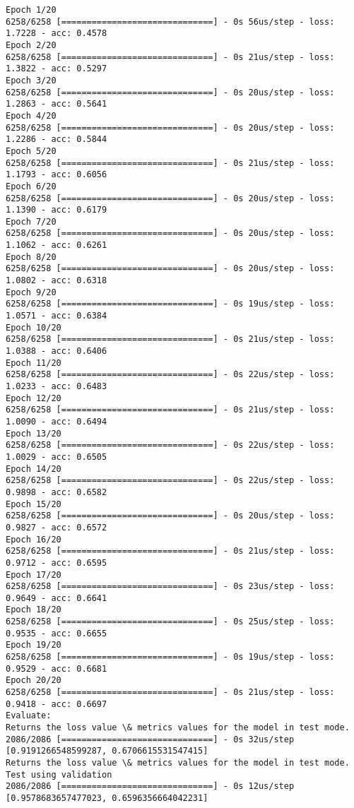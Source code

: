 \documentclass[11pt]{article}
\begin{document}
    \begin{Verbatim}[commandchars=\\\{\}]
Epoch 1/20
6258/6258 [==============================] - 0s 56us/step - loss: 1.7228 - acc: 0.4578
Epoch 2/20
6258/6258 [==============================] - 0s 21us/step - loss: 1.3822 - acc: 0.5297
Epoch 3/20
6258/6258 [==============================] - 0s 20us/step - loss: 1.2863 - acc: 0.5641
Epoch 4/20
6258/6258 [==============================] - 0s 20us/step - loss: 1.2286 - acc: 0.5844
Epoch 5/20
6258/6258 [==============================] - 0s 21us/step - loss: 1.1793 - acc: 0.6056
Epoch 6/20
6258/6258 [==============================] - 0s 20us/step - loss: 1.1390 - acc: 0.6179
Epoch 7/20
6258/6258 [==============================] - 0s 20us/step - loss: 1.1062 - acc: 0.6261
Epoch 8/20
6258/6258 [==============================] - 0s 20us/step - loss: 1.0802 - acc: 0.6318
Epoch 9/20
6258/6258 [==============================] - 0s 19us/step - loss: 1.0571 - acc: 0.6384
Epoch 10/20
6258/6258 [==============================] - 0s 21us/step - loss: 1.0388 - acc: 0.6406
Epoch 11/20
6258/6258 [==============================] - 0s 22us/step - loss: 1.0233 - acc: 0.6483
Epoch 12/20
6258/6258 [==============================] - 0s 21us/step - loss: 1.0090 - acc: 0.6494
Epoch 13/20
6258/6258 [==============================] - 0s 22us/step - loss: 1.0029 - acc: 0.6505
Epoch 14/20
6258/6258 [==============================] - 0s 22us/step - loss: 0.9898 - acc: 0.6582
Epoch 15/20
6258/6258 [==============================] - 0s 20us/step - loss: 0.9827 - acc: 0.6572
Epoch 16/20
6258/6258 [==============================] - 0s 21us/step - loss: 0.9712 - acc: 0.6595
Epoch 17/20
6258/6258 [==============================] - 0s 23us/step - loss: 0.9649 - acc: 0.6641
Epoch 18/20
6258/6258 [==============================] - 0s 25us/step - loss: 0.9535 - acc: 0.6655
Epoch 19/20
6258/6258 [==============================] - 0s 19us/step - loss: 0.9529 - acc: 0.6681
Epoch 20/20
6258/6258 [==============================] - 0s 21us/step - loss: 0.9418 - acc: 0.6697
Evaluate:
Returns the loss value \& metrics values for the model in test mode.
2086/2086 [==============================] - 0s 32us/step
[0.9191266548599287, 0.6706615531547415]
Returns the loss value \& metrics values for the model in test mode. Test using validation
2086/2086 [==============================] - 0s 12us/step
[0.9578683657477023, 0.6596356664042231]

    \end{Verbatim}
\end{document}
